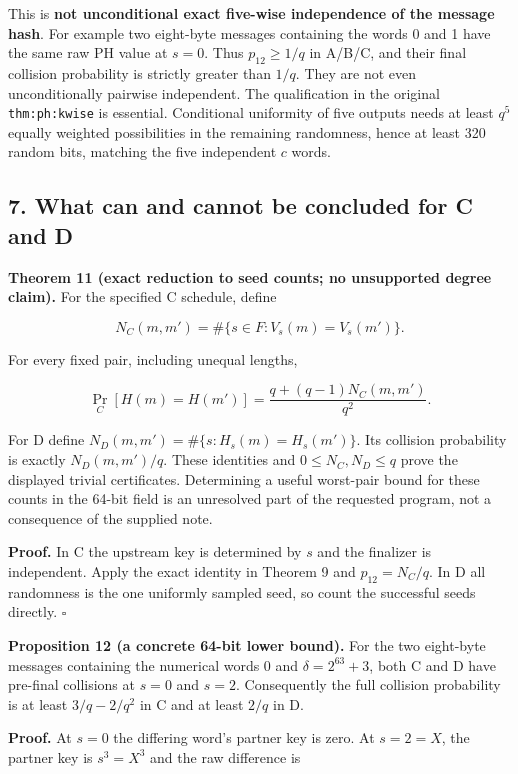 \documentclass[
  11pt,
]{article}
\begin{document}
This is \textbf{not unconditional exact five-wise independence of the
message hash}. For example two eight-byte messages containing the words
0 and 1 have the same raw PH value at \(s=0\). Thus \(p_{12}\ge1/q\) in
A/B/C, and their final collision probability is strictly greater than
\(1/q\). They are not even unconditionally pairwise independent. The
qualification in the original \texttt{thm:ph:kwise} is essential.
Conditional uniformity of five outputs needs at least \(q^5\) equally
weighted possibilities in the remaining randomness, hence at least 320
random bits, matching the five independent \(c\) words.

\subsection{7. What can and cannot be concluded for C and
D}\label{what-can-and-cannot-be-concluded-for-c-and-d}

\textbf{Theorem 11 (exact reduction to seed counts; no unsupported
degree claim).} For the specified C schedule, define

\[ N_C(m,m')=\#\{s\in F:V_s(m)=V_s(m')\}. \]

For every fixed pair, including unequal lengths,

\[ \Pr_C[H(m)=H(m')]=\frac{q+(q-1)N_C(m,m')}{q^2}. \]

For D define \(N_D(m,m')=\#\{s:H_s(m)=H_s(m')\}\). Its collision
probability is exactly \(N_D(m,m')/q\). These identities and
\(0\le N_C,N_D\le q\) prove the displayed trivial certificates.
Determining a useful worst-pair bound for these counts in the 64-bit
field is an unresolved part of the requested program, not a consequence
of the supplied note.

\textbf{Proof.} In C the upstream key is determined by \(s\) and the
finalizer is independent. Apply the exact identity in Theorem 9 and
\(p_{12}=N_C/q\). In D all randomness is the one uniformly sampled seed,
so count the successful seeds directly. \(\square\)

\textbf{Proposition 12 (a concrete 64-bit lower bound).} For the two
eight-byte messages containing the numerical words \(0\) and
\(\delta=2^{63}+3\), both C and D have pre-final collisions at \(s=0\)
and \(s=2\). Consequently the full collision probability is at least
\(3/q-2/q^2\) in C and at least \(2/q\) in D.

\textbf{Proof.} At \(s=0\) the differing word's partner key is zero. At
\(s=2=X\), the partner key is \(s^3=X^3\) and the raw difference is
\end{document}
